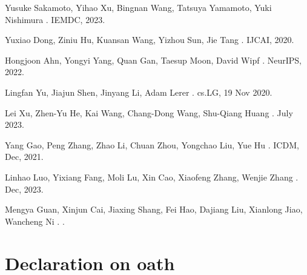 \documentclass{report} %
\begin{document}
\begin{thebibliography}{00}
    \newblock Yusuke Sakamoto, Yihao Xu, Bingnan Wang, Tatsuya Yamamoto, Yuki Nishimura
    .
    \newblock IEMDC, 2023.

    \newblock Yuxiao Dong, Ziniu Hu, Kuansan Wang, Yizhou Sun, Jie Tang
    .
    \newblock IJCAI, 2020.

    \newblock Hongjoon Ahn, Yongyi Yang, Quan Gan, Taesup Moon, David Wipf
    .
    \newblock NeurIPS, 2022.

    \newblock Lingfan Yu, Jiajun Shen, Jinyang Li, Adam Lerer
    .
    \newblock cs.LG, 19 Nov 2020.

    \newblock Lei Xu, Zhen-Yu He, Kai Wang, Chang-Dong Wang, Shu-Qiang Huang
    .
     July 2023.

    \newblock Yang Gao, Peng Zhang, Zhao Li, Chuan Zhou, Yongchao Liu, Yue Hu
    .
    \newblock ICDM, Dec, 2021.

    \newblock Linhao Luo, Yixiang Fang, Moli Lu, Xin Cao, Xiaofeng Zhang, Wenjie Zhang
    .
    \newblock Dec, 2023.

    \newblock Mengya Guan, Xinjun Cai, Jiaxing Shang, Fei Hao, Dajiang Liu, Xianlong Jiao, Wancheng Ni 
    .
    .


    \end{thebibliography}
\newpage 

\newpage 

\chapter*{Declaration on oath}

\vspace{1cm}
\end{document}

